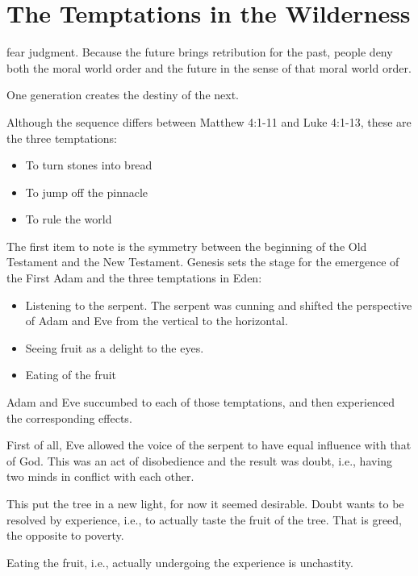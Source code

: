 \section{The Temptations in the Wilderness}

\begin{quotex}
[materialists] fear judgment. Because the future brings retribution for the past, people deny both the moral world order and the future in the sense of that moral world order. 

One generation creates the destiny of the next. 

\end{quotex}
Although the sequence differs between Matthew 4:1-11 and Luke 4:1-13, these are the three temptations:

\begin{itemize}
\item To turn stones into bread 
\item To jump off the pinnacle 
\item To rule the world 
\end{itemize}
The first item to note is the symmetry between the beginning of the Old Testament and the New Testament. Genesis sets the stage for the emergence of the First Adam and the three temptations in Eden:

\begin{itemize}
\item Listening to the serpent. The serpent was cunning and shifted the perspective of Adam and Eve from the vertical to the horizontal. 
\item Seeing fruit as a delight to the eyes. 
\item Eating of the fruit 
\end{itemize}
Adam and Eve succumbed to each of those temptations, and then experienced the corresponding effects.

First of all, Eve allowed the voice of the serpent to have equal influence with that of God. This was an act of disobedience and the result was doubt, i.e., having two minds in conflict with each other.

This put the tree in a new light, for now it seemed desirable. Doubt wants to be resolved by experience, i.e., to actually taste the fruit of the tree. That is greed, the opposite to poverty.

Eating the fruit, i.e., actually undergoing the experience is unchastity.

